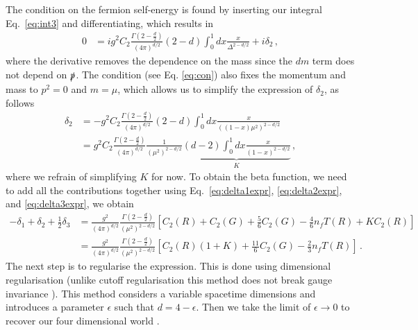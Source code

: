 The condition on the fermion self-energy is found by inserting our integral Eq.~\eqref{eq:int3} and differentiating, which results in
\begin{align}
    0 &= i g^2 C_2 \frac{\Gamma(2 - \frac{d}{2})}{(4\pi)^{d/2}} (2-d) \int_0^1 dx \frac{x}{\Delta^{2 - d/2}} + i \delta_2\,,
\end{align}
where the derivative removes the dependence on the mass since the $dm$ term does not depend on $\slashed{p}$. The condition (see Eq. \eqref{eq:con}) also fixes the momentum and mass to $p^2 = 0$ and $m=\mu$, which allows us to simplify the expression of $\delta_2$, as follows
\begin{align}
    \delta_2 &= -g^2 C_2 \frac{\Gamma(2 - \frac{d}{2})}{(4\pi)^{d/2}} (2-d) \int_0^1 dx \frac{x}{((1-x)\mu^2)^{2 - d/2}} \nonumber\\
    &= g^2 C_2 \frac{\Gamma(2 - \frac{d}{2})}{(4\pi)^{d/2}} \frac{1}{(\mu^2)^{2 - d/2}} \underbrace{(d-2)\int_0^1 dx \frac{x}{(1-x)^{2 - d/2}}}_{K}\,,\label{eq:delta2expr}
\end{align}
where we refrain of simplifying $K$ for now. To obtain the beta function, we need to add all the contributions together using Eq.~\eqref{eq:delta1expr}, \eqref{eq:delta2expr}, and \eqref{eq:delta3expr}, we obtain 
\begin{align}
    -\delta_1 + \delta_2 + \frac{1}{2} \delta_3 &= \frac{g^2}{(4\pi)^{d/2}} \frac{\Gamma(2 - \frac{d}{2})}{(\mu^2)^{2-d/2}} \left[ C_2(R) + C_2(G) + \frac{5}{6} C_2(G) - \frac{4}{6} n_f T(R) + K C_2(R) \right] \\
    &= \frac{g^2}{(4\pi)^{d/2}} \frac{\Gamma(2 - \frac{d}{2})}{(\mu^2)^{2 - d/2}} \left[ C_2(R)(1 + K) + \frac{11}{6} C_2(G) - \frac{2}{3} n_f T(R) \right]\,.\label{eq:d123}
\end{align}
The next step is to regularise the expression. This is done using dimensional regularisation (unlike cutoff regularisation this method does not break gauge invariance \cite{Peskin:1995ev}). This method considers a variable spacetime dimensions and introduces a parameter $\epsilon$ such that $d=4-\epsilon$. Then we take the limit of $\epsilon\to0$ to recover our four dimensional world \cite{tHooft:1972tcz}.

